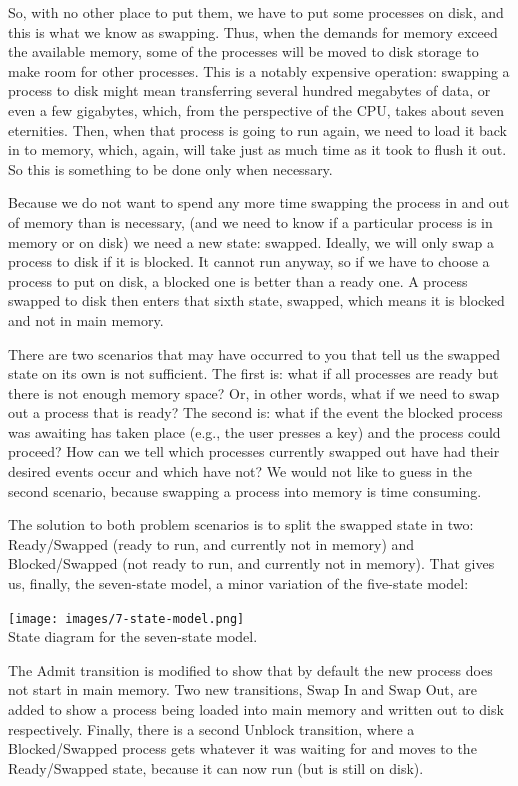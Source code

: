 So, with no other place to put them, we have to put some processes on disk, and this is what we know as swapping. Thus, when the demands for memory exceed the available memory, some of the processes will be moved to disk storage to make room for other processes. This is a notably expensive operation: swapping a process to disk might mean transferring several hundred megabytes of data, or even a few gigabytes, which, from the perspective of the CPU, takes about seven eternities. Then, when that process is going to run again, we need to load it back in to memory, which, again, will take just as much time as it took to flush it out. So this is something to be done only when necessary.

Because we do not want to spend any more time swapping the process in and out of memory than is necessary, (and we need to know if a particular process is in memory or on disk) we need a new state: swapped.  Ideally, we will only swap a process to disk if it is blocked. It cannot run anyway, so if we have to choose a process to put on disk, a blocked one is better than a ready one. A process swapped to disk then enters that sixth state, swapped, which means it is blocked and not in main memory.

There are two scenarios that may have occurred to you that tell us the swapped state on its own is not sufficient. The first is: what if all processes are ready but there is not enough memory space? Or, in other words, what if we need to swap out a process that is ready? The second is: what if the event the blocked process was awaiting has taken place (e.g., the user presses a key) and the process could proceed? How can we tell which processes currently swapped out have had their desired events occur and which have not? We would not like to guess in the second scenario, because swapping a process into memory is time consuming.

The solution to both problem scenarios is to split the swapped state in two: Ready/Swapped (ready to run, and currently not in memory) and Blocked/Swapped (not ready to run, and currently not in memory). That gives us, finally, the seven-state model, a minor variation of the five-state model:

\begin{center}
\texttt{[image: images/7-state-model.png]}\\
State diagram for the seven-state model.
\end{center}

The Admit transition is modified to show that by default the new process does not start in main memory. Two new transitions, Swap In and Swap Out, are added to show a process being loaded into main memory and written out to disk respectively. Finally, there is a second Unblock transition, where a Blocked/Swapped process gets whatever it was waiting for and moves to the Ready/Swapped state, because it can now run (but is still on disk).

